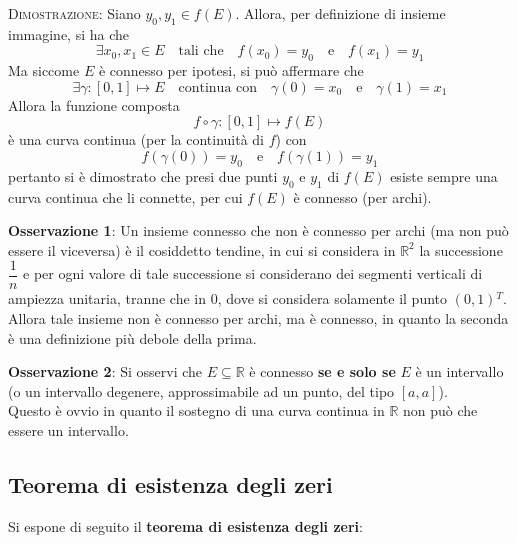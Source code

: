 \documentclass[a4paper]{extarticle}
\begin{document}
\vspace{2em}
\noindent
\normalfont \normalsize
\textsc{Dimostrazione}: Siano $y_0,y_1 \in f(E)$. Allora, per definizione di insieme immagine, si ha che
\[\exists x_0,x_1 \in E \hspace{1em} \text{tali che} \hspace{1em} f(x_0) = y_0 \hspace{1em} \text{e} \hspace{1em} f(x_1)=y_1\]
Ma siccome $E$ è connesso per ipotesi, si può affermare che
\[\exists \gamma : [0,1] \longmapsto E \hspace{1em} \text{continua con} \hspace{1em} \gamma(0)=x_0 \hspace{1em} \text{e} \hspace{1em} \gamma(1) =x_1\]
Allora la funzione composta
\[f \circ \gamma : [0,1] \longmapsto f(E)\]
è una curva continua (per la continuità di $f$) con
\[f(\gamma(0)) = y_0 \hspace{1em} \text{e} \hspace{1em} f(\gamma(1)) = y_1\]
pertanto si è dimostrato che presi due punti $y_0$ e $y_1$ di $f(E)$ esiste sempre una curva continua che li connette, per cui $f(E)$ è connesso (per archi).

\vspace{1em}
\noindent
\textbf{Osservazione 1}: Un insieme connesso che non è connesso per archi (ma non può essere il viceversa) è il cosiddetto tendine, in cui si considera in $\mathbb{R}^2$ la successione $\dfrac{1}{n}$ e per ogni valore di tale successione si considerano dei segmenti verticali di ampiezza unitaria, tranne che in $0$, dove si considera solamente il punto $(0,1){^T}$.\\
Allora tale insieme non è connesso per archi, ma è connesso, in quanto la seconda è una definizione più debole della prima.

\vspace{1em}
\noindent
\textbf{Osservazione 2}: Si osservi che $E \subseteq \mathbb{R}$ è connesso \textbf{se e solo se} $E$ è un intervallo (o un intervallo degenere, approssimabile ad un punto, del tipo $[a,a]$).\\
Questo è ovvio in quanto il sostegno di una curva continua in $\mathbb{R}$ non può che essere un intervallo.

\vspace{1em}
\noindent
\subsection{Teorema di esistenza degli zeri}
Si espone di seguito il \textbf{teorema di esistenza degli zeri}:
\end{document}

